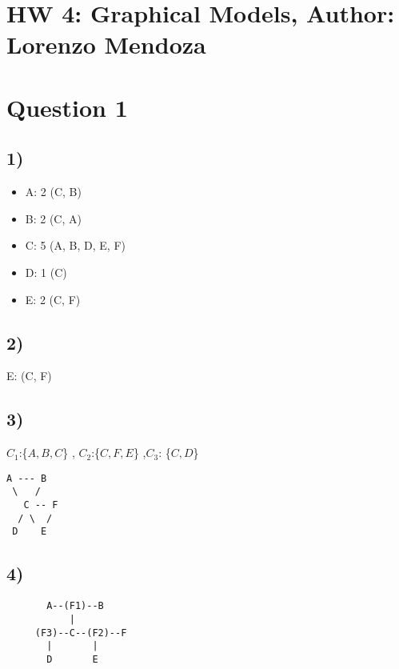 \part{HW 4: Graphical Models, Author: Lorenzo Mendoza}
\label{hw4:graphicalmodelsauthor:lorenzomendoza}

\part{Question 1}
\label{question1}

\chapter{1)}
\label{1}

\begin{itemize}
\item A: 2 (C, B)

\item B: 2 (C, A)

\item C: 5 (A, B, D, E, F)

\item D: 1 (C)

\item E: 2 (C, F)

\end{itemize}

\chapter{2)}
\label{2}

E: (C, F)

\chapter{3)}
\label{3}

$C_1$:\{$A,B,C$\} , $C_2$:\{$C,F,E$\} ,$C_3$: \{$C,D$\}

\begin{verbatim}
A --- B
 \   /
   C -- F
  / \  /
 D    E
\end{verbatim}

\chapter{4)}
\label{4}

\begin{verbatim}
       A--(F1)--B
           |
     (F3)--C--(F2)--F 
       |       |
       D       E
\end{verbatim}

